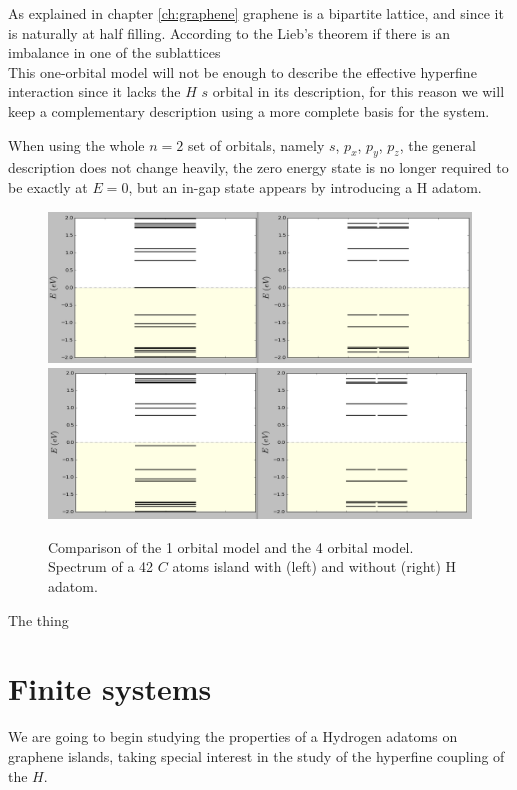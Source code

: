 As explained in chapter \ref{ch:graphene}  graphene is a bipartite lattice, and since it is naturally at half filling. According to the Lieb's theorem if there is an imbalance in one of the sublattices \\

This one-orbital model will not be enough to describe the effective hyperfine interaction since it lacks the $H$ $s$ orbital in its description, for this reason we will keep a complementary description using a more complete basis for the system.

When using the whole $n=2$ set of orbitals, namely $s$, $p_x$, $p_y$, $p_z$, the general description does not change heavily, the zero energy state is no longer required to be exactly at $E=0$, but an in-gap state appears by introducing a H adatom.
\begin{figure}[h!]
\centering
\includegraphics{chapter05/figures/spectrum1orb.png}
\includegraphics{chapter05/figures/spectrum4orb.png}
\vspace{-5pt}
\caption{Comparison of the 1 orbital model and the 4 orbital model. Spectrum of a 42 $C$ atoms island with (left) and without (right) H adatom.}
\label{Label}
\end{figure}
\FloatBarrier
The thing


\section{Finite systems}
We are going to begin studying the properties of a Hydrogen adatoms on graphene islands, taking special interest in the study of the hyperfine coupling of the $H$.

